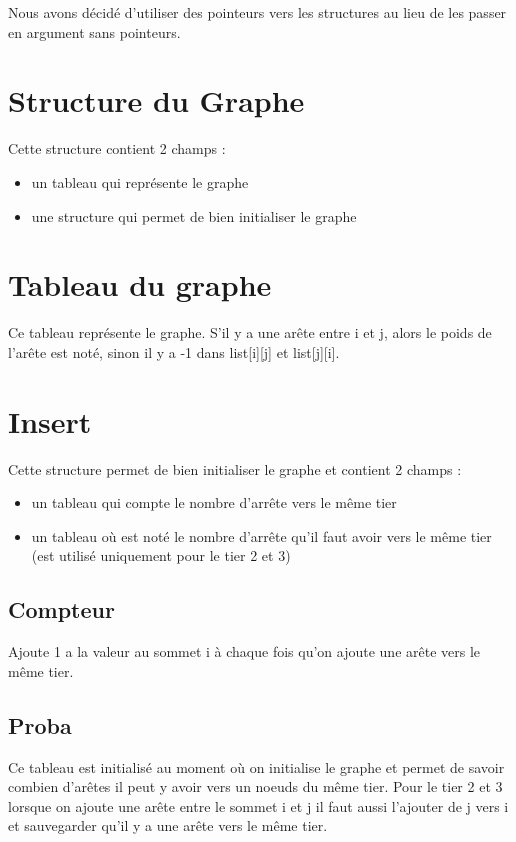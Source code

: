 \documentclass[a4paper,11pt]{report}
\begin{document}
Nous avons décidé d'utiliser des pointeurs vers les structures au lieu de les passer en argument sans pointeurs.

\section{Structure du Graphe}

Cette structure contient 2 champs :
\begin{itemize}
    \item un tableau qui représente le graphe
    \item une structure qui permet de bien initialiser le graphe
\end{itemize}

\section{Tableau du graphe}

Ce tableau représente le graphe. S'il y a une arête entre i et j, alors le poids de l'arête est noté, sinon il y a -1 dans list[i][j] et list[j][i].

\section{Insert}

Cette structure permet de bien initialiser le graphe et contient 2 champs :
\begin{itemize}
    \item un tableau qui compte le nombre d'arrête vers le même tier
    \item un tableau où est noté le nombre d'arrête qu'il faut avoir vers le même tier (est utilisé uniquement pour le tier 2 et 3)
\end{itemize}

\subsection{Compteur}

Ajoute 1 a la valeur au sommet i à chaque fois qu'on ajoute une arête vers le même tier.

\subsection{Proba}

Ce tableau est initialisé au moment où on initialise le graphe et permet de savoir combien d'arêtes il peut y avoir vers un noeuds du même tier. Pour le tier 2 et 3 lorsque on ajoute une arête entre le sommet i et j il faut aussi l'ajouter de j vers i et sauvegarder qu'il y a une arête vers le même tier.
\end{document}
